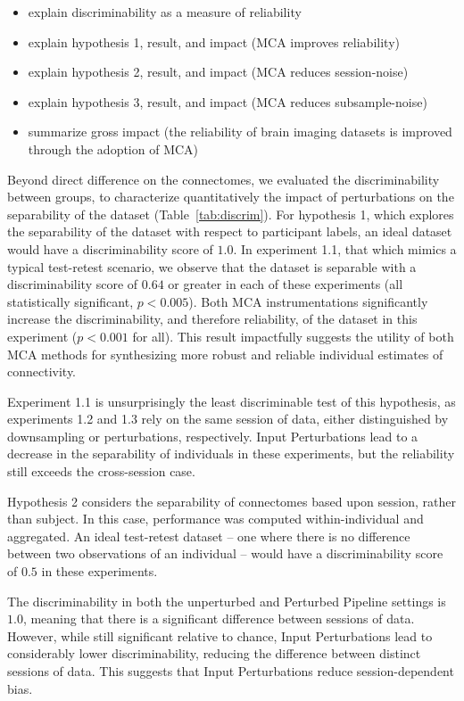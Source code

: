 \documentclass[fleqn,10pt]{SelfArx} %
\begin{document}
\begin{itemize}
\item explain discriminability as a measure of reliability
\item explain hypothesis 1, result, and impact (MCA improves reliability)
\item explain hypothesis 2, result, and impact (MCA reduces session-noise)
\item explain hypothesis 3, result, and impact (MCA reduces subsample-noise)
\item summarize gross impact (the reliability of brain imaging datasets is improved through the adoption of MCA)
\end{itemize}

Beyond direct difference on the connectomes, we evaluated the discriminability between groups, to characterize
quantitatively the impact of perturbations on the separability of the dataset (Table~\ref{tab:discrim}). For
hypothesis 1, which explores the separability of the dataset with respect to participant labels, an ideal dataset would
have a discriminability score of $1.0$. In experiment 1.1, that which mimics a typical test-retest scenario, we observe
that the dataset is separable with a discriminability score of $0.64$ or greater in each of these experiments (all
statistically significant, $p < 0.005$). Both MCA instrumentations significantly increase the discriminability, and
therefore reliability, of the dataset in this experiment ($p < 0.001$ for all). This result impactfully suggests the
utility of both MCA methods for synthesizing more robust and reliable individual estimates of connectivity.

Experiment 1.1 is unsurprisingly the least discriminable test of this hypothesis, as experiments 1.2 and 1.3 rely on
the same session of data, either distinguished by downsampling or perturbations, respectively. Input Perturbations lead
to a decrease in the separability of individuals in these experiments, but the reliability still exceeds the
cross-session case.

Hypothesis 2 considers the separability of connectomes based upon session, rather than subject. In this case,
performance was computed within-individual and aggregated. An ideal test-retest dataset – one where there is no
difference between two observations of an individual – would have a discriminability score of $0.5$ in these
experiments.

The discriminability in both the unperturbed and Perturbed Pipeline settings is $1.0$, meaning that there is a
significant difference between sessions of data. However, while still significant relative to chance, Input
Perturbations lead to considerably lower discriminability, reducing the difference between distinct sessions of data.
This suggests that Input Perturbations reduce session-dependent bias.
\end{document}
